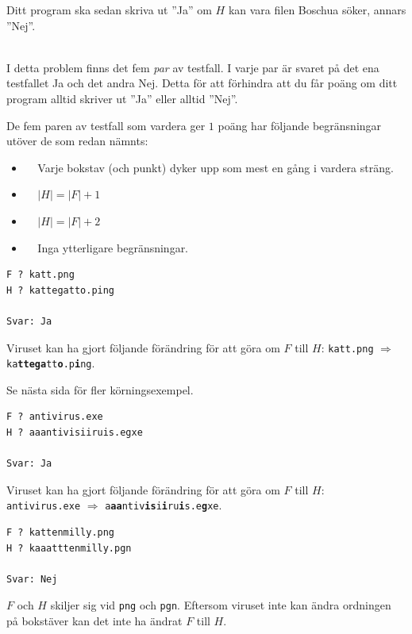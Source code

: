 Ditt program ska sedan skriva ut ”Ja” om $H$ kan vara filen Boschua söker, annars ”Nej”.


\vspace{0.5cm}
\\
I detta problem finns det fem \textit{par} av testfall. I varje par är svaret på det ena testfallet Ja och det andra Nej.
Detta för att förhindra att du får poäng om ditt program alltid skriver ut ”Ja” eller alltid ”Nej”.

De fem paren av testfall som vardera ger $1$ poäng har följande begränsningar utöver de som redan nämnts:
\begin{itemize}
    \item[(Par 1)] $\;\;\;\;$Varje bokstav (och punkt) dyker upp som mest en gång i vardera sträng.    
    \item[(Par 2)] $\;\;\;\;|H| = |F|+1$ 
    \item[(Par 3)] $\;\;\;\;|H| = |F|+2$ 
    \item[(Par 4-5)] $\;\;\;\; $Inga ytterligare begränsningar.
\end{itemize}

\vspace{0.5cm}
\begin{verbatim}
F ? katt.png
H ? kattegatto.ping

Svar: Ja
\end{verbatim}
 Viruset kan ha gjort följande förändring för att göra om $F$ till $H$: \texttt{katt.png} $\Rightarrow$ \texttt{ka\textbf{ttega}tt\textbf{o}.p\textbf{i}ng}.

Se nästa sida för fler körningsexempel.
\newpage

\begin{verbatim}
F ? antivirus.exe
H ? aaantivisiiruis.egxe

Svar: Ja
\end{verbatim}
 Viruset kan ha gjort följande förändring för att göra om $F$ till $H$: \\
\texttt{antivirus.exe} $\Rightarrow$ \texttt{a\textbf{aa}ntiv\textbf{is}i\textbf{i}ru\textbf{i}s.e\textbf{g}xe}.

\begin{verbatim}
F ? kattenmilly.png
H ? kaaatttenmilly.pgn

Svar: Nej
\end{verbatim}
 $F$ och $H$ skiljer sig vid \texttt{png} och \texttt{pgn}. Eftersom viruset inte kan ändra ordningen på bokstäver
kan det inte ha ändrat $F$ till $H$. 



